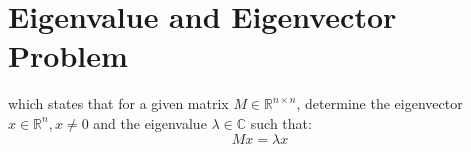 \section{Eigenvalue and Eigenvector Problem}

which states that for a given matrix $M \in \mathbb{R}^{n \times n}$, determine the eigenvector $x \in \mathbb{R}^n, x \neq 0$ and the eigenvalue $\lambda \in \mathbb{C}$ such that:
\begin{equation*}
    Mx = \lambda x
\end{equation*}

